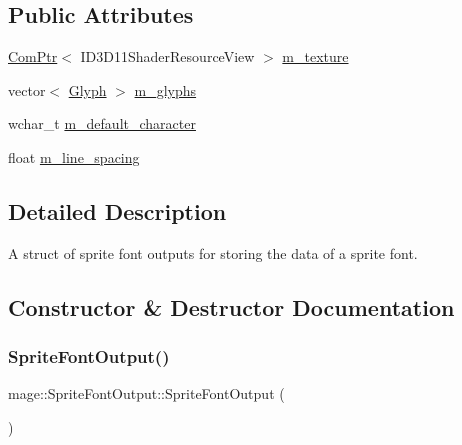 \subsection*{Public Attributes}
\begin{DoxyCompactItemize}
\item 
\hyperlink{namespacemage_ae74f374780900893caa5555d1031fd79}{Com\+Ptr}$<$ I\+D3\+D11\+Shader\+Resource\+View $>$ \hyperlink{structmage_1_1_sprite_font_output_a3e2f3b44decf05bc81ce91f4bf9ad092}{m\+\_\+texture}
\item 
vector$<$ \hyperlink{structmage_1_1_glyph}{Glyph} $>$ \hyperlink{structmage_1_1_sprite_font_output_aee63c847a919bce662dee371594607dd}{m\+\_\+glyphs}
\item 
wchar\+\_\+t \hyperlink{structmage_1_1_sprite_font_output_a137cca7a8a91c623272b345e9931ca80}{m\+\_\+default\+\_\+character}
\item 
float \hyperlink{structmage_1_1_sprite_font_output_adc36a5113ca2473efbc3aa7989606f28}{m\+\_\+line\+\_\+spacing}
\end{DoxyCompactItemize}


\subsection{Detailed Description}
A struct of sprite font outputs for storing the data of a sprite font. 

\subsection{Constructor \& Destructor Documentation}
\hypertarget{structmage_1_1_sprite_font_output_a91ed0cd4cb7f9bfab57ff0e3fa4436bc}{}\label{structmage_1_1_sprite_font_output_a91ed0cd4cb7f9bfab57ff0e3fa4436bc} 
\subsubsection{\texorpdfstring{Sprite\+Font\+Output()}{SpriteFontOutput()}\hspace{0.1cm}{\footnotesize\ttfamily [1/3]}}
{\footnotesize\ttfamily mage\+::\+Sprite\+Font\+Output\+::\+Sprite\+Font\+Output (\begin{DoxyParamCaption}{ }\end{DoxyParamCaption})\hspace{0.3cm}{\ttfamily [default]}}

